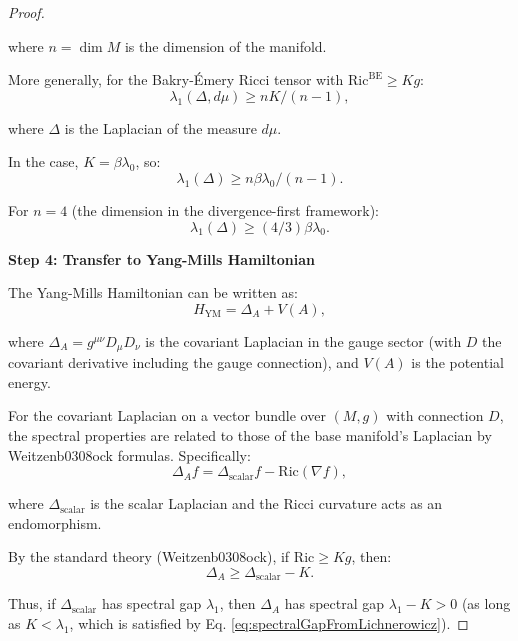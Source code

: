 \begin{proof}
\begin{lemma}
where $n = \dim M$ is the dimension of the manifold.

\end{lemma}

More generally, for the Bakry-Émery Ricci tensor with $\mathrm{Ric}^{\mathrm{BE}} \geq K g$:
\begin{equation}
\lambda_1(\Delta, d\mu) \geq n K / (n - 1),
\end{equation}

where $\Delta$ is the Laplacian of the measure $d\mu$.

In the case, $K = \beta \lambda_0$, so:
\begin{equation}
\lambda_1(\Delta) \geq n \beta \lambda_0 / (n-1).
\label{eq:spectralGapFromLichnerowicz}
\end{equation}

For $n = 4$ (the dimension in the divergence-first framework):
\begin{equation}
\lambda_1(\Delta) \geq (4/3) \beta \lambda_0.
\end{equation}

\textbf{Step 4: Transfer to Yang-Mills Hamiltonian}

The Yang-Mills Hamiltonian can be written as:
\begin{equation}
H_{\text{YM}} = \Delta_A + V(A),
\end{equation}

where $\Delta_A = g^{\mu\nu} D_\mu D_\nu$ is the covariant Laplacian in the gauge sector (with $D$ the covariant derivative including the gauge connection), and $V(A)$ is the potential energy.

For the covariant Laplacian on a vector bundle over $(M, g)$ with connection $D$, the spectral properties are related to those of the base manifold's Laplacian by Weitzenb0308ock formulas. Specifically:
\begin{equation}
\Delta_A f = \Delta_{\text{scalar}} f - \mathrm{Ric}(\nabla f),
\end{equation}

where $\Delta_{\text{scalar}}$ is the scalar Laplacian and the Ricci curvature acts as an endomorphism.

By the standard theory (Weitzenb0308ock), if $\mathrm{Ric} \geq K g$, then:
\begin{equation}
\Delta_A \geq \Delta_{\text{scalar}} - K.
\end{equation}

Thus, if $\Delta_{\text{scalar}}$ has spectral gap $\lambda_1$, then $\Delta_A$ has spectral gap $\lambda_1 - K > 0$ (as long as $K < \lambda_1$, which is satisfied by Eq. \eqref{eq:spectralGapFromLichnerowicz}).


\end{proof}
